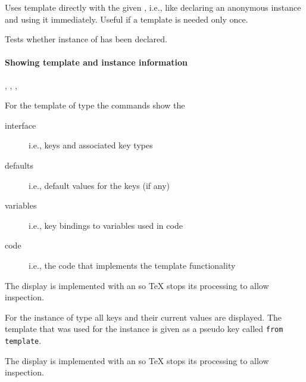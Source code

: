 \documentclass{l3in2edoc}
\let\subsubsubsection\paragraph
\begin{document}
\begin{function}[user]
  {
    \UseTemplate
  }
  \begin{syntax}
         
  \end{syntax}
  Uses template  directly with the given , i.e., like declaring an anonymous instance and using it
  immediately. Useful if a template is needed only once.
\end{function}



\begin{function}[TF,user]
  {
    \IfInstanceExists
  }
  \begin{syntax}
        
  \end{syntax}
  Tests whether instance  of  has been declared.
\end{function}




\subsubsubsection{Showing template and instance information}



\begin{function}[user]
  {
    \ShowTemplateInterface,
    \ShowTemplateDefaults,
    \ShowTemplateVariables,
    \ShowTemplateCode
  }
  \begin{syntax}
       
  \end{syntax}
  For the template  of type  the commands show the
  \begin{description}
  \item[interface] i.e., keys and associated key types
  \item[defaults] i.e., default values for the keys (if any)
  \item[variables] i.e., key bindings to variables used in code
  \item[code] i.e., the code that implements the template functionality
  \end{description}

  The display is implemented with an  so \TeX{} stops
  its processing to allow inspection.
\end{function}




\begin{function}[user]
  {
    \ShowInstanceValues
  }
  \begin{syntax}
      
  \end{syntax}
  For the instance  of type  all keys and their
  current values are displayed. The template that was used for the
  instance is given as a pseudo key called \verb*=from template=.


  The display is implemented with an  so \TeX{} stops
  its processing to allow inspection.
\end{function}
\end{document}
